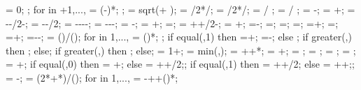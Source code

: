 {{{	 = 0;
};
for \idefl in {+1,...,{\levelnumber}}{
	 = (\idefl-)*\drift;
};
\tempdim = sqrt( + );
\fixbeamx = \collinet/2*/\tempdim;
\fixbeamy = \collinet/2*/\tempdim;
 =  / \storyheight * \baywidth;
 =  / \storyheight * \baywidth;
\rigbasestartx = -\supportwidth;
\rigbaseendx = \x{\columnnumber}+\supportwidth;
\isoboty = -\supportheight-\baselinet/2-\isolationdepth;
\isotopy = -\supportheight-\baselinet/2;
\foundboty = -\supportheight-\baselinet-\isolationdepth-\foundationdepth;
\foundtopy = -\supportheight-\baselinet-\isolationdepth;
\foundstartx = -\foundsidew;
\foundendx = \x{\columnnumber}+\foundsidew;
\structheight=\storynumber*\storyheight;
\isomidy = \supportheight+\isolinet+\isolationdepth/2-\baselinet;
\soilbelowfoundtof = \soilbelowfound+\supportheight;
\basewallstartx=-\supportwidth;
\buildingwidth=\baynumber*\baywidth;
\basewalldepth=\subfloors*\storyheight;
\basewallstarty=\basewalldepth;
\basewallendx=\buildingwidth+\supportwidth;
\basewallendy=\basewallstarty;
\rightsoilx=\buildingwidth+\rightsoildist;
\rightsoily=\basewalldepth-\rightsoildepth-\supportheight;
\isospace = (\buildingwidth)/();
for \kiso in {1,...,{\numberofisolators}}{
\xiso{\kiso} = ()*\isospace;
};
if equal(\isoshiftyn,1) then
{=+\isoshift;
\xiso{\numberofisolators}=\xiso{\numberofisolators}-\isoshift;}
else {};
if greater(\doflocfloor,\storynumber) then {;} else{};
if greater(\dofloccolumn,\columnnumber) then {;} else{};
\dofloch = 1+\doflocfloor;
\minlen = min(\storyheight,\baywidth);
\dofxx = \x{\dofloccolumn}+\dofoffsetratio*\minlen+*\showdefl;
\dofyy = \y{\dofloch}+\dofoffsetratio*\minlen;
\arrlen = \arrowlenratio*\minlen;
\arrrad = \rotarrowlenratio*\minlen;
\Xaxesstarty = ;
\Yaxesstartx = ;
\Yaxesstarty = \y{\levelnumber}+\axisseperation;
if equal(\showsupports,0) then
{\Xaxesstartx = \x{\columnnumber}+\axisseperation;} else
{\Xaxesstartx = \x{\columnnumber}+\axisseperation+\supportwidth/2;};
if equal(\showsupports,1) then
{\Xaxesstartx = \x{\columnnumber}+\axisseperation+\supportwidth/2;} else
{\Xaxesstartx = \x{\columnnumber}+\axisseperation+\supportwidth;};
\pilecoordy = -\supportheight;
\pilespace = 
(2*\supportwidth+*\pilesidespace)/();
for \pileind in {1,...,{\numberofpiles}}{
\pilecoordx{\pileind} = -\supportwidth+\pilesidespace+()*\pilespace;
}}}
